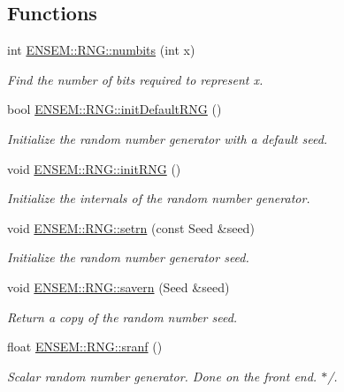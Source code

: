 \subsection*{Functions}
\begin{DoxyCompactItemize}
\item 
int \mbox{\hyperlink{namespaceENSEM_1_1RNG_aa1f3f43467faf807cee97333f92173d4}{E\+N\+S\+E\+M\+::\+R\+N\+G\+::numbits}} (int x)
\begin{DoxyCompactList}\small\item\em Find the number of bits required to represent x. \end{DoxyCompactList}\item 
bool \mbox{\hyperlink{namespaceENSEM_1_1RNG_a4a7ec2d430ab092440b9c3b2b5fd9e64}{E\+N\+S\+E\+M\+::\+R\+N\+G\+::init\+Default\+R\+NG}} ()
\begin{DoxyCompactList}\small\item\em Initialize the random number generator with a default seed. \end{DoxyCompactList}\item 
void \mbox{\hyperlink{namespaceENSEM_1_1RNG_a69ee665fc3157b2080c75a027343d449}{E\+N\+S\+E\+M\+::\+R\+N\+G\+::init\+R\+NG}} ()
\begin{DoxyCompactList}\small\item\em Initialize the internals of the random number generator. \end{DoxyCompactList}\item 
void \mbox{\hyperlink{namespaceENSEM_1_1RNG_ad0ec5508fb072a32d96927e5b752164a}{E\+N\+S\+E\+M\+::\+R\+N\+G\+::setrn}} (const Seed \&seed)
\begin{DoxyCompactList}\small\item\em Initialize the random number generator seed. \end{DoxyCompactList}\item 
void \mbox{\hyperlink{namespaceENSEM_1_1RNG_a5e6a21d205da8a5f8bf3c4732ab5d358}{E\+N\+S\+E\+M\+::\+R\+N\+G\+::savern}} (Seed \&seed)
\begin{DoxyCompactList}\small\item\em Return a copy of the random number seed. \end{DoxyCompactList}\item 
float \mbox{\hyperlink{namespaceENSEM_1_1RNG_a169ccd1627df1ad9983c4ce344d0e36a}{E\+N\+S\+E\+M\+::\+R\+N\+G\+::sranf}} ()
\begin{DoxyCompactList}\small\item\em Scalar random number generator. Done on the front end. $\ast$/. \end{DoxyCompactList}\end{DoxyCompactItemize}
